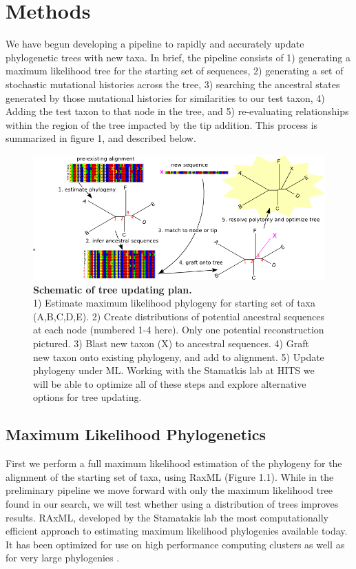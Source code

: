 \documentclass[10pt]{article}
\begin{document}
\section*{Methods}

We have begun developing a pipeline to rapidly and accurately update phylogenetic trees with new taxa. 
In brief, the pipeline consists of
    1) generating a maximum likelihood tree for the starting set of sequences,
    2) generating a set of stochastic mutational histories across the tree,
    3) searching the ancestral states generated by those mutational histories for similarities to our test taxon,
    4) Adding the test taxon to that node in the tree, and
    5) re-evaluating relationships within the region of the tree impacted by the tip addition. 
This process is summarized in figure 1, and described below.

\begin{figure}[!ht]
\begin{center}
\includegraphics[scale=.7]{fig.png}
\end{center}
\caption{
{\bf Schematic of tree updating plan. \\
}  1) Estimate maximum likelihood phylogeny for starting set of taxa (A,B,C,D,E).
2) Create distributions of potential ancestral sequences at each node (numbered 1-4 here).
Only one potential reconstruction pictured.
3) Blast new taxon (X) to ancestral sequences.
4) Graft new taxon onto existing phylogeny, and add to alignment.
5) Update phylogeny under ML.
Working with the Stamatkis lab at HITS we will be able to optimize all of these steps and explore alternative options for tree updating.
}
\label{Figure_label}
\end{figure}

\subsection*{Maximum Likelihood Phylogenetics}
First we perform a full maximum likelihood estimation of the phylogeny for the alignment of the starting set of taxa, using RaxML \cite{stamatakis_RAxML-VI-HPC:_2006} (Figure 1.1). 
While in the preliminary pipeline we move forward with only the maximum likelihood tree found in our search, we will test whether using a distribution of trees improves results. 
RAxML, developed by the Stamatakis lab the most computationally efficient approach to estimating maximum likelihood phylogenies available today. 
It has been optimized for use on high performance computing clusters \cite{stamatakis_RAxML-VI-HPC:_2006} as well as for very large phylogenies \cite{stamatakis_RAxML-Light:_2012}.
\end{document}
